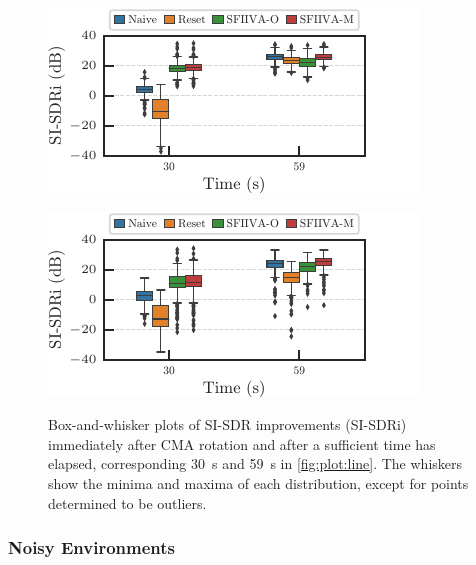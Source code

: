 \documentclass[sip,biber]{now-journal}
\begin{document}
\begin{figure}
  \begin{minipage}[t]{.45\textwidth}
    \centering\includegraphics{figures/plots/clean/box_980.pdf}\label{fig:plot:box:980}
  \end{minipage}
  \hspace{.05\textwidth}
  \begin{minipage}[t]{.45\textwidth}
    \centering\includegraphics{figures/plots/clean/box_990.pdf}\label{fig:plot:box:990}
  \end{minipage}
  \caption{%
    Box-and-whisker plots of SI-SDR improvements (SI-SDRi) immediately after CMA rotation and after a sufficient time has elapsed, corresponding \SI{30}{\second} and \SI{59}{\second} in \cref{fig:plot:line}.
    The whiskers show the minima and maxima of each distribution, except for points determined to be outliers.
  }%
  \label{fig:plot:box}
\end{figure}

\subsubsection{Noisy Environments}
\end{document}
